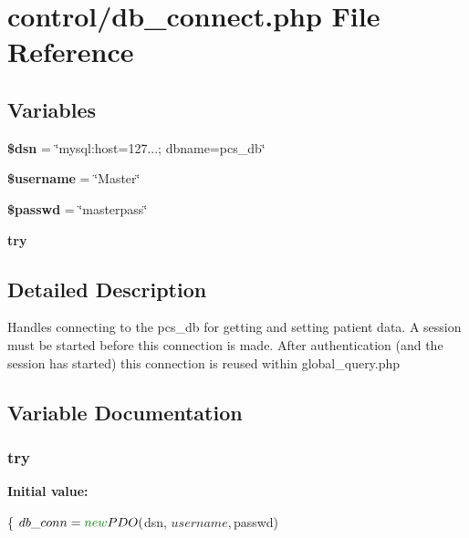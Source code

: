 \hypertarget{db__connect_8php}{\section{control/db\-\_\-connect.php File Reference}
\label{db__connect_8php}
}
\subsection*{Variables}
\begin{DoxyCompactItemize}
\item 
\hypertarget{db__connect_8php_a6441cca8c9fa11e16d2017e8cb733c10}{{\bfseries \$dsn} = \char`\"{}mysql\-:host=127...; dbname=pcs\-\_\-db\char`\"{}}\label{db__connect_8php_a6441cca8c9fa11e16d2017e8cb733c10}

\item 
\hypertarget{db__connect_8php_a0eb82aa5f81cf845de4b36cd653c42cf}{{\bfseries \$username} = \char`\"{}Master\char`\"{}}\label{db__connect_8php_a0eb82aa5f81cf845de4b36cd653c42cf}

\item 
\hypertarget{db__connect_8php_a87911b6664e118fbbfa8da7bb7a04b0f}{{\bfseries \$passwd} = \char`\"{}masterpass\char`\"{}}\label{db__connect_8php_a87911b6664e118fbbfa8da7bb7a04b0f}

\item 
{\bfseries try}
\end{DoxyCompactItemize}


\subsection{Detailed Description}
Handles connecting to the pcs\-\_\-db for getting and setting patient data. A session must be started before this connection is made. After authentication (and the session has started) this connection is reused within global\-\_\-query.\-php 

\subsection{Variable Documentation}
\hypertarget{db__connect_8php_abe4cc9788f52e49485473dc699537388}{
\subsubsection[{try}]{\setlength{\rightskip}{0pt plus 5cm}try}}\label{db__connect_8php_abe4cc9788f52e49485473dc699537388}
{\bfseries Initial value\-:}
\begin{DoxyCode}
\{
    $db\_conn = \textcolor{keyword}{new} PDO($dsn, $username, $passwd)
\end{DoxyCode}
